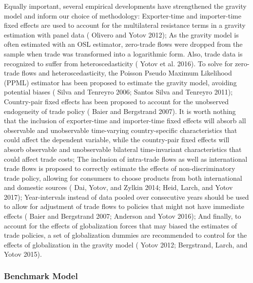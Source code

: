 \documentclass[12pt]{article}%
\begin{document}
Equally important, several empirical developments have strengthened the
gravity model and inform our choice of methodology: Exporter-time and
importer-time fixed effects are used to account for the multilateral
resistance terms in a gravity estimation with panel data (\cite{olivero_dynamic_2012} Olivero and
Yotov 2012); As the gravity model is often estimated with an OSL
estimator, zero-trade flows were dropped from the sample when trade was
transformed into a logarithmic form. Also, trade data is recognized to
suffer from heteroscedasticity (\cite{yotov_advanced_2016} Yotov et al. 2016). To solve for
zero-trade flows and heteroscedasticity, the Poisson Pseudo Maximum
Likelihood (PPML) estimator has been proposed to estimate the gravity
model, avoiding potential biases (\cite{silva_log_2006} Silva and Tenreyro 2006; \cite{santos_silva_further_2011} Santos Silva
and Tenreyro 2011); Country-pair fixed effects has been proposed to
account for the unobserved endogeneity of trade policy (\cite{baier_free_2007-1} Baier and
Bergstrand 2007). It is worth nothing that the inclusion of
exporter-time and importer-time fixed effects will absorb all observable
and unobservable time-varying country-specific characteristics that
could affect the dependent variable, while the country-pair fixed
effects will absorb observable and unobservable bilateral time-invariant
characteristics that could affect trade costs; The inclusion of
intra-trade flows as well as international trade flows is proposed to
correctly estimate the effects of non-discriminatory trade policy,
allowing for consumers to choose products from both international and
domestic sources (\cite{dai_trade-diversion_2014} Dai, Yotov, and Zylkin 2014; \cite{heid_estimating_2017} Heid, Larch, and Yotov
2017); Year-intervals instead of data pooled over consecutive years
should be used to allow for adjustment of trade flows to policies that
might not have immediate effects (\cite{baier_free_2007-2} Baier and Bergstrand 2007; \cite{anderson_terms_2016-1} Anderson
and Yotov 2016); And finally, to account for the effects of
globalization forces that may biased the estimates of trade policies, a
set of globalization dummies are recommended to control for the effects
of globalization in the gravity model (\cite{yotov_simple_2012} Yotov 2012; \cite{bergstrand_economic_2015} Bergstrand, Larch,
and Yotov 2015).%
\subsubsection{Benchmark Model}%
\label{ssubsec:BenchmarkModel}%
\end{document}
